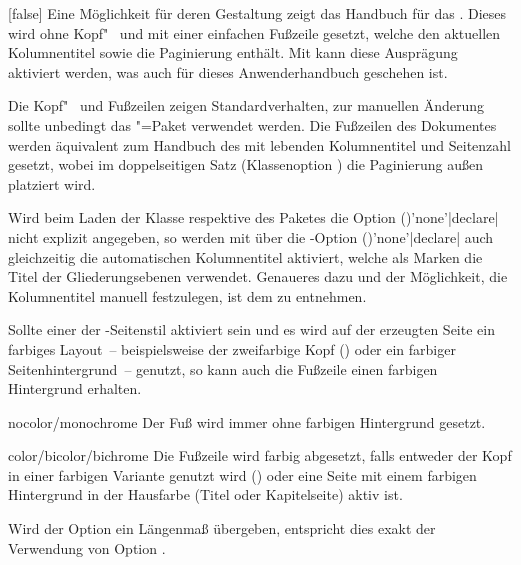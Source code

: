 \begin{Declaration*}{}
\begin{Declaration*}{}
\begin{Declaration*}{}
\begin{Declaration}[%
  v2.03!\Option{cdfoot=color}:farbiger Hintergrund der Fußzeile;%
  v2.03!\Option{cdfoot=\PValueName{Höhe}};%
]{}[false]
Eine Möglichkeit für deren Gestaltung zeigt das Handbuch für das \TUDCD. Dieses 
wird ohne Kopf"~ und mit einer einfachen Fußzeile gesetzt, welche den aktuellen 
Kolumnentitel sowie die Paginierung enthält. Mit  kann diese 
Ausprägung aktiviert werden, was auch für dieses Anwenderhandbuch geschehen ist.
%
\begin{values}{}
\itemfalse
  Die Kopf"~ und Fußzeilen zeigen Standardverhalten, zur manuellen Änderung 
  sollte unbedingt das \KOMAScript"=Paket  verwendet 
  werden.
\itemtrue*
  Die Fußzeilen des Dokumentes werden äquivalent zum Handbuch des \TUDCDs mit 
  lebenden Kolumnentitel und Seitenzahl gesetzt, wobei im doppelseitigen Satz 
  (Klassenoption ) die Paginierung außen platziert wird.
\end{values}
%
Wird beim Laden der Klasse respektive des Paketes  
die Option ()'none'|declare| nicht 
explizit angegeben, so werden mit  über die 
\KOMAScript-Option ()'none'|declare| 
auch gleichzeitig die automatischen Kolumnentitel aktiviert, welche als Marken 
die Titel der Gliederungsebenen verwendet. Genaueres dazu und der Möglichkeit, 
die Kolumnentitel manuell festzulegen, ist dem \scrguide zu entnehmen.

Sollte einer der -Seitenstil aktiviert sein und es wird 
auf der erzeugten Seite ein farbiges Layout~--  beispielsweise der zweifarbige 
Kopf () oder ein farbiger Seitenhintergrund~-- genutzt, 
so kann auch die Fußzeile einen farbigen Hintergrund erhalten.
%
\begin{values}{}
\item[nocolor/monochrome]
  Der Fuß wird immer ohne farbigen Hintergrund gesetzt.
\item[color/bicolor/bichrome]
  Die Fußzeile wird farbig abgesetzt, falls entweder der Kopf in einer farbigen
  Variante genutzt wird () oder eine Seite mit einem 
  farbigen Hintergrund in der Hausfarbe (Titel oder Kapitelseite) aktiv ist.
\item[\PValueName{Höhe}]
  Wird der Option ein Längenmaß übergeben, entspricht dies exakt der Verwendung 
  von Option .
\end{values}
\end{Declaration}


\end{Declaration*}
\end{Declaration*}
\end{Declaration*}
